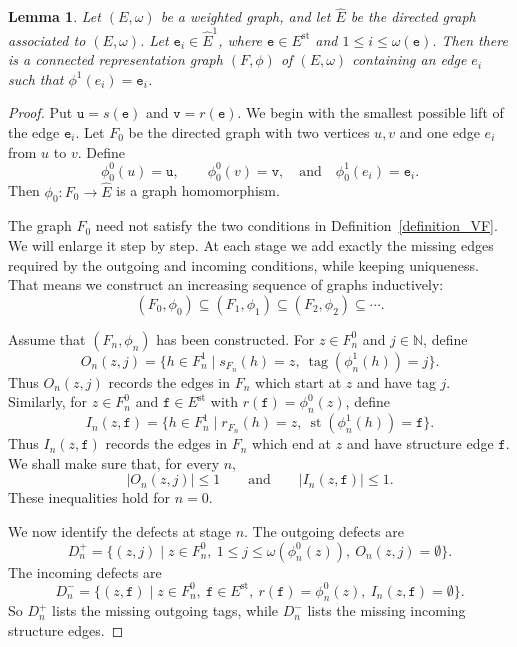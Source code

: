 \documentclass[10pt,a4paper]{amsart}
\newtheorem{lemma}{Lemma}
\begin{document}
\begin{lemma}\label{lem:prescribed-lift}
Let $(E,\omega)$ be a weighted graph, and let $\widehat E$ be the directed graph associated to $(E,\omega)$. Let $\mathtt{e}_i\in \widehat E^1$, where $\mathtt{e}\in E^{\mathrm{st}}$ and $1\leq i\leq \omega(\mathtt{e})$. Then there is a connected representation graph $(F,\phi)$ of $(E,\omega)$ containing an edge $e_i$ such that $\phi^1(e_i)=\mathtt{e}_i$.
\end{lemma}

\begin{proof}
Put $\mathtt{u}=s(\mathtt{e})$ and $\mathtt{v}=r(\mathtt{e})$. We begin with the smallest possible lift of the edge $\mathtt{e}_i$. Let $F_0$ be the directed graph with two vertices $u,v$ and one edge $e_i$ from $u$ to $v$. Define
$$
\phi_0^0(u)=\mathtt{u},\qquad
\phi_0^0(v)=\mathtt{v},\quad\text{and}\quad
\phi_0^1(e_i)=\mathtt{e}_i.
$$
Then $\phi_0:F_0\to \widehat E$ is a graph homomorphism.

The graph $F_0$ need not satisfy the two conditions in Definition~\ref{definition_VF}. We will enlarge it step by step. At each stage we add exactly the missing edges required by the outgoing and incoming conditions, while keeping uniqueness. That means we construct an increasing sequence of graphs inductively:
$$
(F_0,\phi_0)\subseteq (F_1,\phi_1)\subseteq (F_2,\phi_2)\subseteq\cdots .
$$

Assume that $(F_n,\phi_n)$ has been constructed. For $z\in F_n^0$ and $j\in\mathbb N$, define
$$
O_n(z,j)=
\{h\in F_n^1\mid s_{F_n}(h)=z,\ 
\operatorname{tag}(\phi_n^1(h))=j\}.
$$
Thus $O_n(z,j)$ records the edges in $F_n$ which start at $z$ and have tag $j$. Similarly, for $z\in F_n^0$ and $\mathtt{f}\in E^{\mathrm{st}}$ with $r(\mathtt{f})=\phi_n^0(z)$, define
$$
I_n(z,\mathtt{f})=
\{h\in F_n^1\mid r_{F_n}(h)=z,\ 
\operatorname{st}(\phi_n^1(h))=\mathtt{f}\}.
$$
Thus $I_n(z,\mathtt{f})$ records the edges in $F_n$ which end at $z$ and have structure edge $\mathtt{f}$. We shall make sure that, for every $n$,
\begin{equation}\label{eq:In-On}
|O_n(z,j)|\leq 1\qquad \text{and}\qquad |I_n(z,\mathtt{f})|\leq 1.
\end{equation}
These inequalities hold for $n=0$.

We now identify the defects at stage $n$. The outgoing defects are
$$
D_n^+=\{(z,j)\mid z\in F_n^0,\ 1\leq j\leq \omega(\phi_n^0(z)),
\ O_n(z,j)=\emptyset\}.
$$
The incoming defects are
$$
D_n^-=\{(z,\mathtt{f})\mid z\in F_n^0,\ \mathtt{f}\in E^{\mathrm{st}},
\ r(\mathtt{f})=\phi_n^0(z),\ I_n(z,\mathtt{f})=\emptyset\}.
$$
So $D_n^+$ lists the missing outgoing tags, while $D_n^-$ lists the missing incoming structure edges.


\end{proof}
\end{document}
